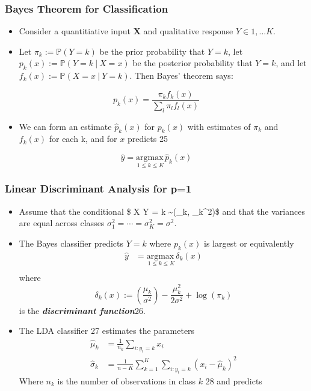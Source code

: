 \documentclass[11pt]{article}
\providecommand{\tightlist}{%
      \setlength{\itemsep}{0pt}\setlength{\parskip}{0pt}}
\begin{document}
    \hypertarget{bayes-theorem-for-classification}{%
\subsubsection{Bayes Theorem for
Classification}\label{bayes-theorem-for-classification}}

    \begin{itemize}
\item
  Consider a quantitiative input \(\mathbf{X}\) and qualitative response
  \(Y \in {1, \dots K}\).
\item
  Let \(\pi_k := \mathbb{P}(Y = k)\) be the prior probability that
  \(Y=k\), let \(p_k(x) := \mathbb{P}(Y = k\ |\ X = x)\) be the
  posterior probability that \(Y = k\), and let
  \(f_k(x):= \mathbb{P}(X = x\ |\ Y = k)\). Then Bayes' theorem says:
\end{itemize}

\[ p_k(x) = \frac{\pi_k f_k(x)}{\sum_{l}\pi_l f_l(x)} \]

\begin{itemize}
\tightlist
\item
  We can form an estimate \(\hat{p}_k(x)\) for \(p_k(x)\) with estimates
  of \(\pi_k\) and \(f_k(x)\) for each k, and for \(x\) predicts 25
\end{itemize}

\[\hat{y} = \underset{1 \leqslant k \leqslant K}{\text{argmax}\,} \hat{p}_k(x) \]

    \hypertarget{linear-discriminant-analysis-for-p1}{%
\subsubsection{Linear Discriminant Analysis for
p=1}\label{linear-discriminant-analysis-for-p1}}

    \begin{itemize}
\item
  Assume that the conditional \$ X\textbar{} Y = k
  \sim {}(\mu\_k, \sigma\_k\^{}2)\$ and that the variances
  are equal across classes
  \(\sigma_1^2 = \cdots = \sigma_K^2 = \sigma^2\).
\item
  The Bayes classifier predicts \(Y = k\) where \(p_k(x)\) is largest or
  equivalently \begin{align*}
  \hat{y}
  &= \underset{1 \leqslant k \leqslant K}{\text{argmax}\ } \delta_k(x)\\
  \end{align*} where
  \[ \delta_k(x) := \left(\frac{\mu_k}{\sigma^2}\right) - \frac{\mu_k^2}{2\sigma^2} + \log(\pi_k)\]
  is the \textbf{\emph{discriminant function}}26.
\item
  The LDA classifier 27 estimates the parameters \begin{align*}
  \hat{\mu}_k &= \frac{1}{n_k}\sum_{i: y_i = k} x_i\\
  \hat{\sigma}_k &= \frac{1}{n-K} \sum_{k = 1}^K \sum_{i: y_i = k} \left(x_i - \hat{\mu}_k\right)^2
  \end{align*} Where \(n_k\) is the number of observations in class
  \(k\) 28 and predicts
\end{itemize}
\end{document}

